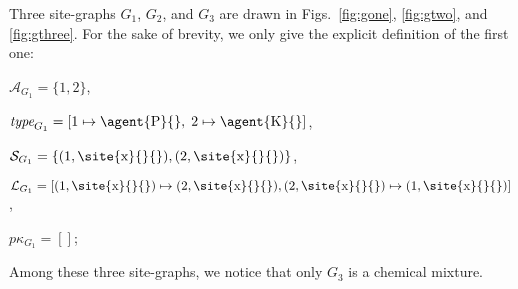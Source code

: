 \documentclass[10pt,a4paper]{llncs}
\newcommand{\graphsymb}{G}
\newcommand{\agents}[1][]{\mathcal{A}_{#1}}
\newcommand{\type}[1][]{\textit{type}_{#1}}
\newcommand{\sites}[1][]{\mathcal{S}_{#1}}
\newcommand{\links}[1][]{\mathcal{L}_{#1}}
\newcommand{\props}[1][]{p\kappa_{#1}}
\newcommand{\freesymbol}{\dashv}
\begin{document}
\begin{example}%
Three site-graphs $\graphsymb_1$, $\graphsymb_2$, and $\graphsymb_3$ are drawn in Figs.~\ref{fig:gone}, \ref{fig:gtwo}, and \ref{fig:gthree}. For the sake of brevity, we only give the explicit definition of the first one:
\begin{inparaenum}
\item $\agents[\graphsymb_1]=\{1,2\}$,
\item $\type[\graphsymb_1]=[1 \mapsto \text{\agent{P}{}},\;2 \mapsto \text{\agent{K}{}}]$,
\item $\sites[\graphsymb_1]=\{(1,\text{\site{x}{}{}}),(2,\text{\site{x}{}{}})\}$,
\item $\links[\graphsymb_1]=[(1,\text{\site{x}{}{}}) \mapsto (2,\text{\site{x}{}{}}), (2,\text{\site{x}{}{}}) \mapsto (1,\text{\site{x}{}{}})]$,
\item $\props[\graphsymb_1]=[]$;
\end{inparaenum}
 Among these three site-graphs, we notice that only  $\graphsymb_3$ is a chemical mixture.
\end{example}
\end{document}

